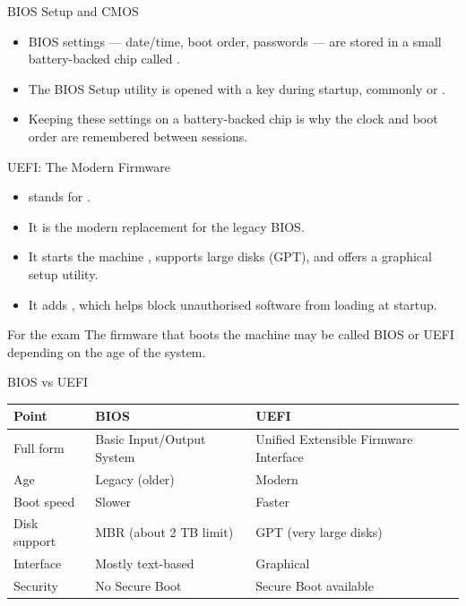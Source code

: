 \documentclass[aspectratio=169]{beamer}
\begin{document}
\begin{frame}{BIOS Setup and CMOS}
  \begin{itemize}
    \item BIOS settings --- date/time, boot order, passwords --- are stored in
      a small battery-backed chip called .
    \item The BIOS Setup utility is opened with a key during startup,
      commonly  or .
    \item Keeping these settings on a battery-backed chip is why the clock
      and boot order are remembered between sessions.
  \end{itemize}
  \vspace{0.2cm}
\end{frame}

\begin{frame}{UEFI: The Modern Firmware}
  \begin{itemize}
    \item {} stands for .
    \item It is the modern replacement for the legacy BIOS.
    \item It starts the machine , supports large disks (GPT), and
      offers a graphical setup utility.
    \item It adds , which helps block unauthorised software
      from loading at startup.
  \end{itemize}
  \begin{block}{For the exam}
    The firmware that boots the machine may be called BIOS or UEFI depending
    on the age of the system.
  \end{block}
\end{frame}

\begin{frame}{BIOS vs UEFI}
  \begin{center}
    \begin{tabular}{p{}p{}p{}}
      \toprule
      \textbf{Point} & \textbf{BIOS} & \textbf{UEFI} \\
      \midrule
      Full form & Basic Input/Output System & Unified Extensible Firmware Interface \\
      Age & Legacy (older) & Modern \\
      Boot speed & Slower & Faster \\
      Disk support & MBR (about 2 TB limit) & GPT (very large disks) \\
      Interface & Mostly text-based & Graphical \\
      Security & No Secure Boot & Secure Boot available \\
      \bottomrule
    \end{tabular}
  \end{center}
\end{frame}
\end{document}
